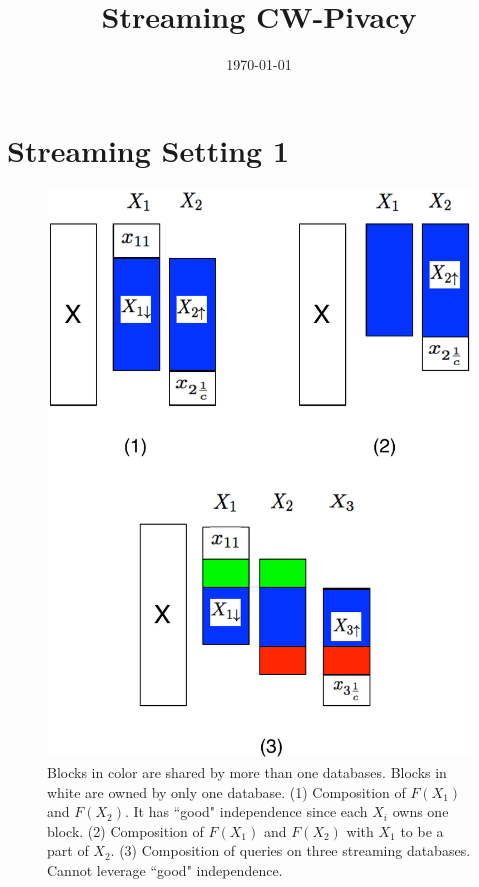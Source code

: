\documentclass[11pt]{article}
\title{Streaming CW-Pivacy}
\date{\today}
\begin{document}
\maketitle
\section{Streaming Setting 1}
\begin{figure}[th]
\centering
\includegraphics[width=4.5in]{fig/stream_database3.pdf}
\caption{\label{stream_db3} Blocks in color are shared by more than one databases. Blocks in white are owned by only one database. (1) Composition of $F(X_{1})$ and $F(X_{2})$. It has ``good" independence since each $X_{i}$ owns one block. (2) Composition of $F(X_{1})$ and $F(X_{2})$ with $X_{1}$ to be a part of $X_{2}$. (3) Composition of queries on three streaming databases. Cannot leverage ``good" independence.}
\end{figure}
\end{document}
